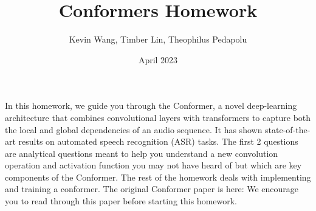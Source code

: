 \documentclass{article}
\title{Conformers Homework}
\author{Kevin Wang, Timber Lin, Theophilus Pedapolu}
\date{April 2023}
\begin{document}
\maketitle
\thispagestyle{plain}
\noindent
In this homework, we guide you through the Conformer, a novel deep-learning architecture that combines convolutional layers with transformers to capture both the local and global dependencies of an audio sequence. It has shown state-of-the-art results on automated speech recognition (ASR) tasks. The first 2 questions are analytical questions meant to help you understand a new convolution operation and activation function you may not have heard of but which are key components of the Conformer. The rest of the homework deals with implementing and training a conformer. The original Conformer paper is here: \href{https://arxiv.org/abs/2005.08100}{\color{blue}{https://arxiv.org/abs/2005.08100}} We encourage you to read through this paper before starting this homework.

\newpage
\thispagestyle{plain}
\end{document}

